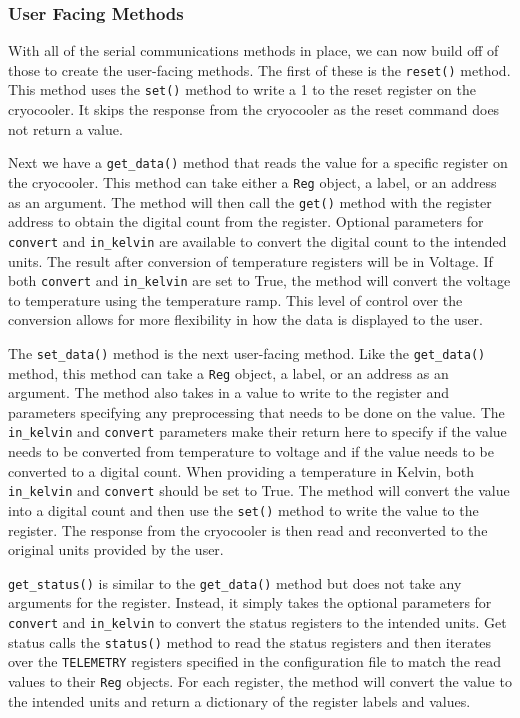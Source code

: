 \subsubsection{User Facing Methods}
With all of the serial communications methods in place, we can now build off of those to create the user-facing methods.
The first of these is the \texttt{reset()} method.
This method uses the \texttt{set()} method to write a 1 to the reset register on the cryocooler.
It skips the response from the cryocooler as the reset command does not return a value.

Next we have a \texttt{get\_data()} method that reads the value for a specific register on the cryocooler.
This method can take either a \texttt{Reg} object, a label, or an address as an argument.
The method will then call the \texttt{get()} method with the register address to obtain the digital count from the register.
Optional parameters for \texttt{convert} and \texttt{in\_kelvin} are available to convert the digital count to the intended units.
The result after conversion of temperature registers will be in Voltage.
If both \texttt{convert} and \texttt{in\_kelvin} are set to True, the method will convert the voltage to temperature using the temperature ramp.
This level of control over the conversion allows for more flexibility in how the data is displayed to the user.

The \texttt{set\_data()} method is the next user-facing method.
Like the \texttt{get\_data()} method, this method can take a \texttt{Reg} object, a label, or an address as an argument.
The method also takes in a value to write to the register and parameters specifying any preprocessing that needs to be done on the value.
The \texttt{in\_kelvin} and \texttt{convert} parameters make their return here to specify if the value needs to be converted from temperature to voltage and if the value needs to be converted to a digital count.
When providing a temperature in Kelvin, both \texttt{in\_kelvin} and \texttt{convert} should be set to True.
The method will convert the value into a digital count and then use the \texttt{set()} method to write the value to the register.
The response from the cryocooler is then read and reconverted to the original units provided by the user.

\texttt{get\_status()} is similar to the \texttt{get\_data()} method but does not take any arguments for the register.
Instead, it simply takes the optional parameters for \texttt{convert} and \texttt{in\_kelvin} to convert the status registers to the intended units.
Get status calls the \texttt{status()} method to read the status registers and then iterates over the \texttt{TELEMETRY} registers specified in the configuration file to match the read values to their \texttt{Reg} objects. 
For each register, the method will convert the value to the intended units and return a dictionary of the register labels and values.

